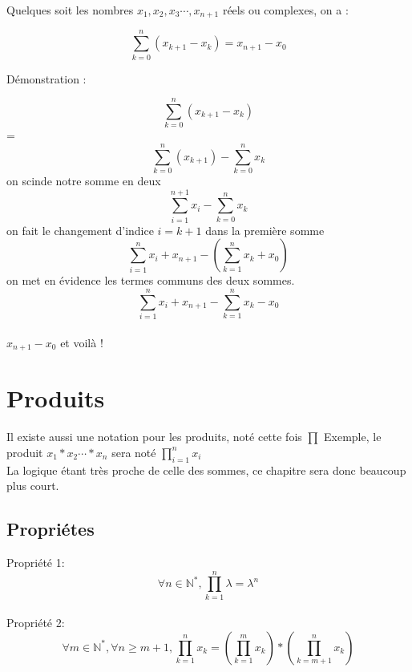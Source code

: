 \documentclass{article}
\begin{document}
Quelques soit les nombres $x_{1},x_{2},x_{3}\cdots,x_{n+1}$ réels ou complexes, on a :
\begin{center}
  \[\sum_{k=0}^{n} (x_{k+1}-x_{k}) = x_{n+1}-x_{0}\]
\end{center}
Démonstration :
\begin{center}
  \[\sum_{k=0}^{n} (x_{k+1}-x_{k})\] =\\
  \[\sum_{k=0}^{n} (x_{k+1}) - \sum_{k=0}^{n}x_{k}\] on scinde notre somme en deux\\
  \[\sum_{i=1}^{n+1} x_{i} - \sum_{k=0}^{n}x_{k}\] on fait le changement d'indice $i = k+1$ dans la première somme\\
  \[\sum_{i=1}^{n} x_{i}+x_{n+1} - (\sum_{k=1}^{n}x_{k} + x_{0})\] on met en évidence les termes communs des deux sommes.\\
  \[\sum_{i=1}^{n} x_{i}+x_{n+1} - \sum_{k=1}^{n}x_{k} - x_{0}\]\\
  $x_{n+1}-x_{0}$ et voilà !
\end{center}
\section{Produits}

  Il existe aussi une notation pour les produits, noté cette fois $\prod$
  Exemple, le produit $x_{1} * x_{2} \cdots * x_{n}$ sera noté $\prod_{i=1}^{n}x_{i}$\\
  La logique étant très proche de celle des sommes, ce chapitre sera donc beaucoup plus court.

  \subsection{Propriétes}
    Propriété 1: $$\forall n \in \mathbb{N}^{*}, \prod_{k=1}^{n}\lambda = \lambda^{n}$$\\
    Propriété 2: $$\forall m \in \mathbb{N}^{*}, \forall n \ge m+1, \prod_{k=1}^{n}x_{k} =  (\prod_{k=1}^{m}x_{k}) * (\prod_{k=m+1}^{n}x_{k})$$
\end{document}
